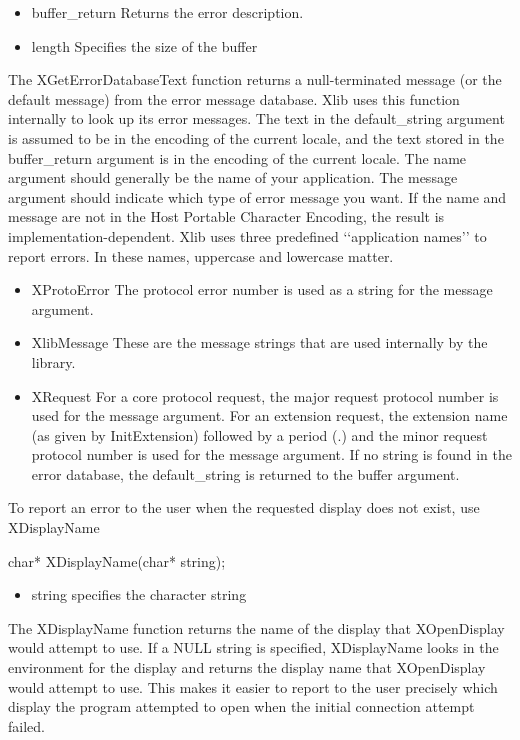 \documentclass{report}
\begin{document}
\begin{itemize}
\begin{itemize}
                \item buffer\_return Returns the error description.
                \item length Specifies the size of the buffer
            \end{itemize}
            The XGetErrorDatabaseText function returns a null-terminated message (or the default message) from the error message database. Xlib uses this function internally to look up its error messages. The text in the default\_string argument is assumed to be in the encoding of the current locale, and the text stored in the buffer\_return argument is in the encoding of the current locale.
            \bigbreak \noindent 
            The name argument should generally be the name of your application. The message argument should indicate which type of error message you want. If the name and message are not in the Host Portable Character Encoding, the result is implementation-dependent. Xlib uses three predefined ‘‘application names’’ to report errors. In these names, uppercase and lowercase matter.
            \begin{itemize}
                \item XProtoError The protocol error number is used as a string for the message argument.
                \item XlibMessage These are the message strings that are used internally by the library.
                \item XRequest For a core protocol request, the major request protocol number is used for the message argument. For an extension request, the extension name (as given by InitExtension) followed by a period (.) and the minor request protocol number is used for the message argument. If no string is found in the error database, the default\_string is returned to the buffer argument.
            \end{itemize}
            To report an error to the user when the requested display does not exist, use XDisplayName
            \bigbreak \noindent 
            \begin{cppcode}
            char* XDisplayName(char* string);
            \end{cppcode}
            \begin{itemize}
                \item string specifies the character string
            \end{itemize}
            The XDisplayName function returns the name of the display that XOpenDisplay would attempt to use. If a NULL string is specified, XDisplayName looks in the environment for the display and returns the display name that XOpenDisplay would attempt to use. This makes it easier to report to the user precisely which display the program attempted to open when the initial connection attempt failed.

\end{itemize}
\end{document}
